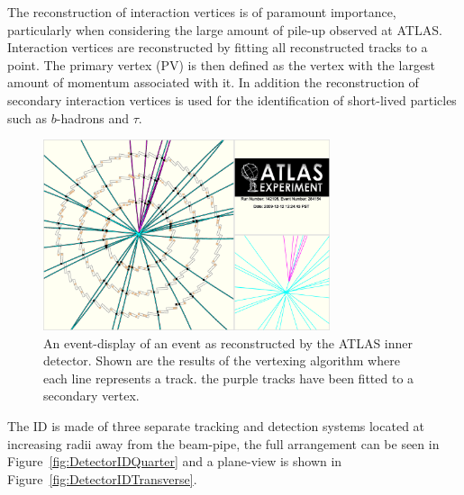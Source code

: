 The reconstruction of interaction vertices is of paramount importance, particularly when considering the large amount of pile-up observed at ATLAS. Interaction vertices are reconstructed by fitting all reconstructed tracks to a point. The primary vertex (PV) is then defined as the vertex with the largest amount of momentum associated with it. In addition the reconstruction of secondary interaction vertices is used for the identification of short-lived particles such as $b$-hadrons and $\tau$.

\begin{figure}[htbp]
  \centering
  \includegraphics[width=0.75\textwidth]{PartDetector/Diagrams/fig_14.eps}
  \caption{An event-display of an event as reconstructed by the ATLAS inner detector. Shown are the results of the vertexing algorithm where each line represents a track. the purple tracks have been fitted to a secondary vertex.}
  \label{fig:DetectorEventDisplayID}
\end{figure}

The ID is made of three separate tracking and detection systems located at increasing radii away from the beam-pipe, the full arrangement can be seen in Figure~\ref{fig:DetectorIDQuarter} and a plane-view is shown in Figure~\ref{fig:DetectorIDTransverse}.


